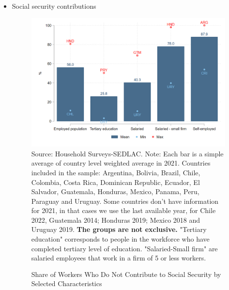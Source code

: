 \documentclass[english]{article}
\begin{document}
\begin{itemize}
        
 \item Social security contributions
    \begin{itemize}
        \begin{figure}[!htb]
        \justifying
        \caption{Share of Workers Who Do Not Contribute to Social Security by Selected Characteristics}     
        \includegraphics[scale=.3]{latex/figures/Snapshot/Social security contributions.png}
        \label{fig:SScontributions}
        \footnotesize{Source: Household Surveys-SEDLAC.}
        \footnotesize{Note: Each bar is a simple average of country level weighted average in 2021. Countries included in the sample: Argentina, Bolivia, Brazil, Chile, Colombia, Costa Rica, Dominican Republic, Ecuador, El Salvador, Guatemala, Honduras, Mexico, Panama, Peru, Paraguay and Uruguay. Some countries don’t have information for 2021, in that cases we use the last available year, for Chile 2022, Guatemala 2014; Honduras 2019; Mexico 2018 and Uruguay 2019. \textbf{The groups are not exclusive.} "Tertiary education" corresponds to people in the workforce who have completed tertiary level of education. "Salaried-Small firm" are salaried employees that work in a firm of 5 or less workers.}
        \end{figure}



\end{itemize}
\end{itemize}
\end{document}
